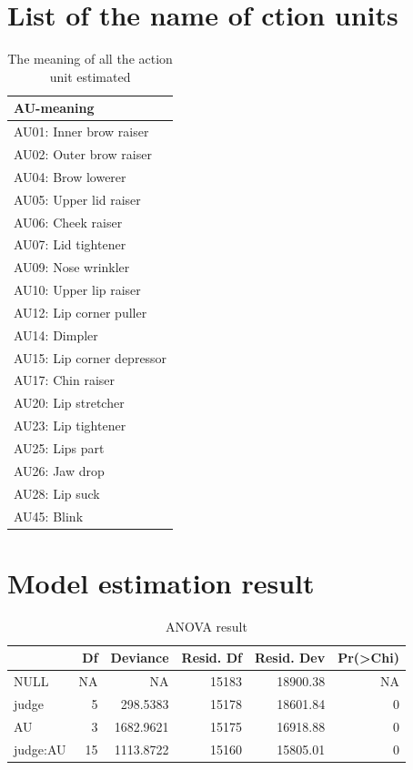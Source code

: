 \documentclass{monashthesis}
\begin{document}
\hypertarget{list-of-the-name-of-ction-units}{%
\section{List of the name of ction units}\label{list-of-the-name-of-ction-units}}

\begin{table}[ht]
\begin{center}
\caption{\label{tab:au_meaning} The meaning of all the action unit estimated}
\begin{tabular}{l}
\toprule
AU-meaning \\
\midrule
AU01: Inner brow raiser \\
AU02: Outer brow raiser \\
AU04: Brow lowerer \\
AU05: Upper lid raiser \\
AU06: Cheek raiser \\
AU07: Lid tightener \\
AU09: Nose wrinkler \\
AU10: Upper lip raiser \\
AU12: Lip corner puller \\
AU14: Dimpler \\
AU15: Lip corner depressor \\
AU17: Chin raiser \\
AU20: Lip stretcher \\
AU23: Lip tightener \\
AU25: Lips part \\
AU26: Jaw drop \\
AU28: Lip suck \\
AU45: Blink \\
\bottomrule
\end{tabular}
\end{center}
\end{table}

\hypertarget{model-estimation-result}{%
\section{Model estimation result}\label{model-estimation-result}}

\begin{table}

\caption{\label{tab:anova}\label{tab:anova}ANOVA result}
\centering
\begin{tabular}[t]{l|r|r|r|r|r}
\hline
  & Df & Deviance & Resid. Df & Resid. Dev & Pr(>Chi)\\
\hline
NULL & NA & NA & 15183 & 18900.38 & NA\\
\hline
judge & 5 & 298.5383 & 15178 & 18601.84 & 0\\
\hline
AU & 3 & 1682.9621 & 15175 & 16918.88 & 0\\
\hline
judge:AU & 15 & 1113.8722 & 15160 & 15805.01 & 0\\
\hline
\end{tabular}
\end{table}
\end{document}
